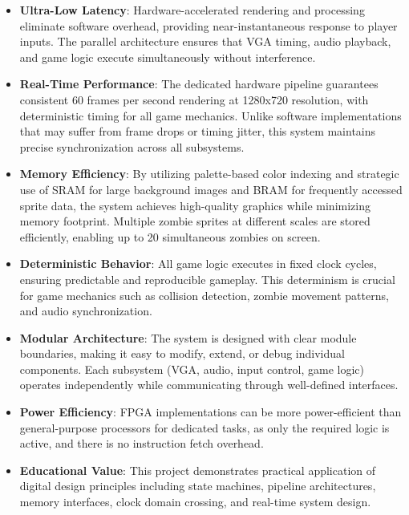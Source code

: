 \documentclass[12pt,a4paper]{article}
\begin{document}
\begin{itemize}
    \item \textbf{Ultra-Low Latency}: Hardware-accelerated rendering and processing eliminate software overhead, providing near-instantaneous response to player inputs. The parallel architecture ensures that VGA timing, audio playback, and game logic execute simultaneously without interference.
    
    \item \textbf{Real-Time Performance}: The dedicated hardware pipeline guarantees consistent 60 frames per second rendering at 1280x720 resolution, with deterministic timing for all game mechanics. Unlike software implementations that may suffer from frame drops or timing jitter, this system maintains precise synchronization across all subsystems.
    
    \item \textbf{Memory Efficiency}: By utilizing palette-based color indexing and strategic use of SRAM for large background images and BRAM for frequently accessed sprite data, the system achieves high-quality graphics while minimizing memory footprint. Multiple zombie sprites at different scales are stored efficiently, enabling up to 20 simultaneous zombies on screen.
    
    \item \textbf{Deterministic Behavior}: All game logic executes in fixed clock cycles, ensuring predictable and reproducible gameplay. This determinism is crucial for game mechanics such as collision detection, zombie movement patterns, and audio synchronization.
    
    \item \textbf{Modular Architecture}: The system is designed with clear module boundaries, making it easy to modify, extend, or debug individual components. Each subsystem (VGA, audio, input control, game logic) operates independently while communicating through well-defined interfaces.
    
    \item \textbf{Power Efficiency}: FPGA implementations can be more power-efficient than general-purpose processors for dedicated tasks, as only the required logic is active, and there is no instruction fetch overhead.
    
    \item \textbf{Educational Value}: This project demonstrates practical application of digital design principles including state machines, pipeline architectures, memory interfaces, clock domain crossing, and real-time system design.
\end{itemize}
\end{document}
